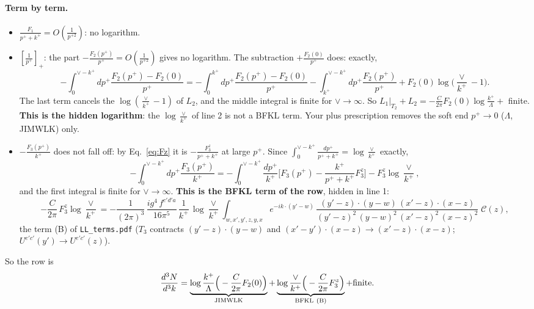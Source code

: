 \documentclass[10pt]{article}
\numberwithin{equation}{section}
\begin{document}
\paragraph{Term by term.}
\begin{itemize}
\item $\frac{F_1}{p^++k^+}=O(\frac{1}{p^{+2}})$: no logarithm.
\item $\left[\frac{1}{p^+}\right]_+$: the part $-\frac{F_2(p^+)}{p^+}=O(\frac{1}{p^{+2}})$ gives no logarithm. The subtraction $+\frac{F_2(0)}{p^+}$ does: exactly,
\begin{equation*}
-\int_0^{\vee-k^+}dp^+\frac{F_2(p^+)-F_2(0)}{p^+}=-\int_0^{k^+}dp^+\frac{F_2(p^+)-F_2(0)}{p^+}-\int_{k^+}^{\vee-k^+}dp^+\frac{F_2(p^+)}{p^+}+F_2(0)\log\Big(\frac{\vee}{k^+}-1\Big).
\end{equation*}
The last term cancels the $\log(\frac{\vee}{k^+}-1)$ of $L_2$, and the middle integral is finite for $\vee\to\infty$. So $L_1|_{T_2}+L_2=-\frac{C}{2\pi}F_2(0)\log\frac{k^+}{\Lambda}+$ finite. \textbf{This is the hidden logarithm}: the $\log\frac{\vee}{k^+}$ of line 2 is not a BFKL term. Your plus prescription removes the soft end $p^+\to0$ ($\Lambda$, JIMWLK) only.
\item $-\frac{F_3(p^+)}{k^+}$ does not fall off: by Eq.~\eqref{eq:Fz} it is $-\frac{F_3^z}{p^++k^+}$ at large $p^+$. Since $\int_0^{\vee-k^+}\frac{dp^+}{p^++k^+}=\log\frac{\vee}{k^+}$ exactly,
\begin{equation*}
-\int_0^{\vee-k^+}dp^+\frac{F_3(p^+)}{k^+}=-\int_0^{\vee-k^+}\frac{dp^+}{k^+}\Big[F_3(p^+)-\frac{k^+}{p^++k^+}F_3^z\Big]-F_3^z\log\frac{\vee}{k^+},
\end{equation*}
and the first integral is finite for $\vee\to\infty$. \textbf{This is the BFKL term of the row}, hidden in line 1:
\begin{equation}
-\frac{C}{2\pi}\,F_3^z\log\frac{\vee}{k^+}=-\frac{1}{(2\pi)^{3}}\, \frac{ig^{4}\,f^{c'd'a}}{16\pi^{5}}\, \frac{1}{k^{+}}\,\log\frac{\vee}{k^{+}}\int_{w,x',y',z,y,x} e^{-ik\cdot (y'-w)}\,\frac{(y'-z)\cdot (y-w)\,(x'-z)\cdot (x-z)}{(y'-z)^{2}\,(y-w)^{2}\,(x'-z)^{2}\,(x-z)^{2}}\;\mathcal C(z),
\end{equation}
the term (B) of \texttt{LL\_terms.pdf} ($T_3$ contracts $(y'-z)\cdot(y-w)$ and $(x'-y')\cdot(x-z)\to(x'-z)\cdot(x-z)$; $U^{e'c'}(y')\to U^{e'c'}(z)$).
\end{itemize}
So the row is
\begin{equation}
\frac{d^3N}{d^3k}=\underbrace{\log\frac{k^+}{\Lambda}\Big(-\frac{C}{2\pi}F_2(0)\Big)}_{\rm JIMWLK}+\underbrace{\log\frac{\vee}{k^+}\Big(-\frac{C}{2\pi}F_3^z\Big)}_{\rm BFKL\ (B)}+\text{finite}.
\end{equation}
\end{document}
